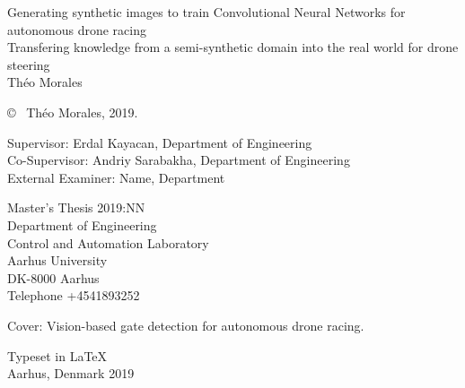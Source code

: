 \newpage
\thispagestyle{plain}
\vspace*{4.5cm}
Generating synthetic images to train Convolutional Neural Networks for autonomous
drone racing\\
Transfering knowledge from a semi-synthetic domain into the real world for drone
steering\\
Théo Morales \setlength{\parskip}{1cm}

\copyright ~ Théo Morales, 2019. \setlength{\parskip}{1cm}

Supervisor: Erdal Kayacan, Department of Engineering\\
Co-Supervisor: Andriy Sarabakha, Department of Engineering\\
External Examiner: Name, Department \setlength{\parskip}{1cm}

Master's Thesis 2019:NN\\	%
Department of Engineering\\
Control and Automation Laboratory\\
Aarhus University\\
DK-8000 Aarhus\\
Telephone +4541893252 \setlength{\parskip}{0.5cm}

\vfill
Cover: Vision-based gate detection for autonomous drone racing. \setlength{\parskip}{0.5cm}

Typeset in \LaTeX \\
Aarhus, Denmark 2019

